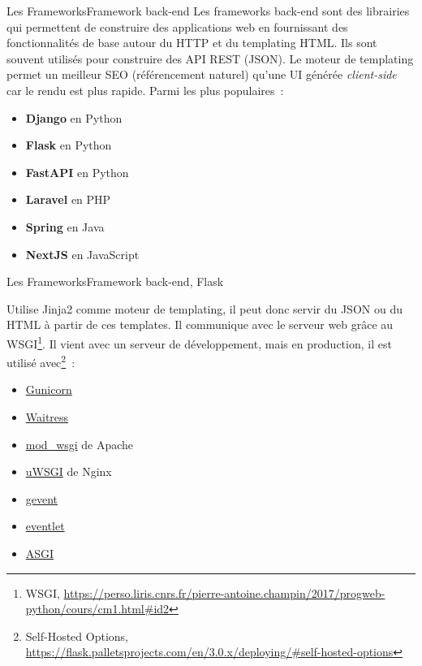 \documentclass{beamer}
\begin{document}
    \begin{frame}{Les Frameworks}{Framework back-end}
        Les frameworks back-end sont des librairies qui permettent de construire des applications web en fournissant des fonctionnalités de base autour du HTTP et du templating HTML.
        \bigbreak
        Ils sont souvent utilisés pour construire des API REST (JSON).
        Le moteur de templating permet un meilleur SEO (référencement naturel) qu'une UI générée \textit{client-side} car le rendu est plus rapide.
        \bigbreak
        Parmi les plus populaires~:
        \begin{itemize}
            \item \textbf{Django} en Python
            \item \textbf{Flask} en Python
            \item \textbf{FastAPI} en Python
            \item \textbf{Laravel} en PHP
            \item \textbf{Spring} en Java
            \item \textbf{NextJS} en JavaScript
        \end{itemize}
    \end{frame}

    \begin{frame}{Les Frameworks}{Framework back-end, Flask}
        \begin{small}
            Utilise Jinja2 comme moteur de templating, il peut donc servir du JSON ou du HTML à partir de ces templates.
            \bigbreak
            Il communique avec le serveur web grâce au WSGI\footnote{WSGI, \url{https://perso.liris.cnrs.fr/pierre-antoine.champin/2017/progweb-python/cours/cm1.html\#id2}}.
            \bigbreak
            Il vient avec un serveur de développement, mais en production, il est utilisé avec\footnote{Self-Hosted Options, \url{https://flask.palletsprojects.com/en/3.0.x/deploying/\#self-hosted-options}}~:
            \begin{itemize}
                \item \href{https://flask.palletsprojects.com/en/3.0.x/deploying/gunicorn/}{Gunicorn}
                \item \href{https://flask.palletsprojects.com/en/3.0.x/deploying/waitress/}{Waitress}
                \item \href{https://flask.palletsprojects.com/en/3.0.x/deploying/mod_wsgi/}{mod\_wsgi} de Apache
                \item \href{https://flask.palletsprojects.com/en/3.0.x/deploying/uwsgi/}{uWSGI} de Nginx
                \item \href{https://flask.palletsprojects.com/en/3.0.x/deploying/gevent/}{gevent}
                \item \href{https://flask.palletsprojects.com/en/3.0.x/deploying/eventlet/}{eventlet}
                \item \href{https://flask.palletsprojects.com/en/3.0.x/deploying/asgi/}{ASGI}
            \end{itemize}
        \end{small}
    \end{frame}
\end{document}

